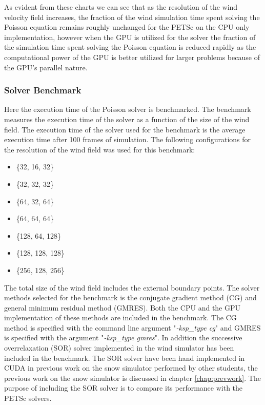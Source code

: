As evident from these charts we can see that as the resolution of the wind
velocity field increases, the fraction of the wind simulation time spent solving
the Poisson equation remains roughly unchanged for the PETSc on the CPU only
implementation, however when the GPU is utilized for the solver the fraction of
the simulation time spent solving the Poisson equation is reduced rapidly as
the computational power of the GPU is better utilized for larger problems because
of the GPU's parallel nature.

\subsubsection{Solver Benchmark}



Here the execution time of the Poisson solver is benchmarked. The benchmark
measures the execution time of the solver as a function of the size of the
wind field. The execution time of the solver used for the benchmark is the
average execution time after 100 frames of simulation. The following
configurations for the resolution of the wind field was used for this benchmark:
\begin{itemize}
	\item \{32, 16, 32\}
	\item \{32, 32, 32\}
	\item \{64, 32, 64\}
	\item \{64, 64, 64\}
	\item \{128, 64, 128\}
	\item \{128, 128, 128\}
	\item \{256, 128, 256\}
\end{itemize}

The total size of the wind field includes the external boundary points. The
solver methods selected for the benchmark is the conjugate gradient method (CG)
and general minimum residual method (GMRES). Both the CPU and the GPU
implementation of these methods are included in the benchmark. The CG method is
specified with the command line argument "\emph{-ksp\_type cg}" and GMRES is
specified with the argument "\emph{-ksp\_type gmres}". In addition the
successive overrelaxation (SOR) solver implemented in the wind simulator has
been included in the benchmark. The SOR solver have been hand implemented in
CUDA in previous work on the snow simulator performed by other students, the
previous work on the snow simulator is discussed in chapter \ref{chap:prevwork}.
The purpose of including the SOR solver is to compare its performance with the
PETSc solvers.

